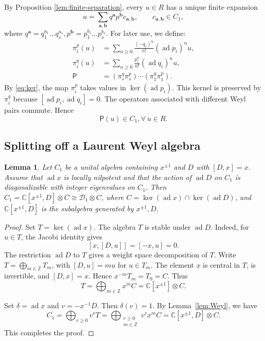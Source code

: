 \documentclass[12pt,a4paper]{amsart}
\numberwithin{equation}{section}
\newtheorem{lemma}[theorem]{Lemma}
\theoremstyle{definition}
\theoremstyle{remark}
\newcommand{\C}{\mathbb{C}}
\newcommand{\m}{\mathfrak m}
\newcommand{\D}{\mathcal D}
\newcommand{\Z}{\mathbb Z}
\newcommand{\ad}{\operatorname{ad}}
\newcommand{\Proj}{\mathsf P}
\newcommand{\ba}{\mathbf{a}}
\newcommand{\bb}{\mathbf{b}}
\begin{document}
By Proposition \ref{lem:finite-separation}, every \(u\in R\) has a unique finite expansion
\[
 u=\sum_{\ba,\bb}
 q^{\ba}p^{\bb}
 c_{\ba,\bb},
 \qquad c_{\ba,\bb}\in C_1,
\]
where $q^{\ba}=q_1^{a_1}\dots q_s^{a_s}, p^{\bb}=p_1^{b_1}\dots p_s^{b_s}$.  For later use, we define:
\begin{equation}\label{eq:P-def}
 \begin{aligned}
 \pi_i^p(u)&=\sum_{n\geq0}\frac{(-q_i)^n}{n!}(\ad p_i)^n u,\\
 \pi_i^q(u)&=\sum_{n\geq0}\frac{p_i^n}{n!}(\ad q_i)^n u,\\
 \Proj&=(\pi_s^q\pi_s^p)\cdots(\pi_1^q\pi_1^p).
 \end{aligned}
\end{equation}
By \eqref{eq:ker}, the map $\pi_i^p$ takes values in
$\ker(\ad p_i)$. This kernel is preserved by $\pi_i^q$ because
$[\ad p_i,\ad q_i]=0$. The operators associated with different Weyl
pairs commute. Hence
\begin{equation}\label{eq:P} \Proj(u)\in C_1, \forall\  u\in R.
\end{equation}



\subsection{Splitting off a Laurent Weyl algebra}
\label{ssec:Laurent}

\begin{lemma}\label{lem:Laurent-splitting}
Let \(C_1\) be a unital algebra containing \(x^{\pm1}\) and \(D\) with
\([D,x]=x\). Assume that \(\ad x\) is locally nilpotent and that
the action of \(\ad D\)  on $C_1$ is diagonalizable with integer eigenvalues on \(C_1\).
Then  $C_1=\C[x^{\pm 1}, D]\otimes C\cong \D_1\otimes C$, where
$C=\ker(\ad x)\cap\ker(\ad D)$, and $\C[x^{\pm 1}, D]$ is the subalgebra generated by $x^{\pm 1}, D$.
\end{lemma}

\begin{proof}
Set $T=\ker(\ad x)$. The algebra \(T\) is stable under \(\ad D\).
Indeed, for \(u\in T\), the Jacobi identity gives
\[
 [x,[D,u]]=[-x,u]=0.
\]
The restriction \(\ad D\) to \(T\) gives a weight space decomposition of $T$.
Write \(T=\bigoplus_{m\in\Z}T_m\), with \([D,u]=mu\) for \(u\in T_m\).
The element \(x\) is central in \(T\), is invertible, and $[D,x]=x$.
Hence  \(x^{-m}T_m=T_0=C\).
Thus
\[
 T=\bigoplus_{m\in\Z}x^m C=\C[x^{\pm1}]\otimes C.
\]


Set \(\delta=\ad x\) and \(v=-x^{-1}D\).
Then \(\delta(v)=1\). By Lemma~\ref{lem:Weyl}, we have
\[
 C_1=\bigoplus_{r\geq0}v^rT
  =\bigoplus_{\substack{r\geq0\\m\in\Z}}
     v^r x^m C=\C[x^{\pm 1}, D]\otimes C.
\]
This completes the proof.
\end{proof}
\end{document}
